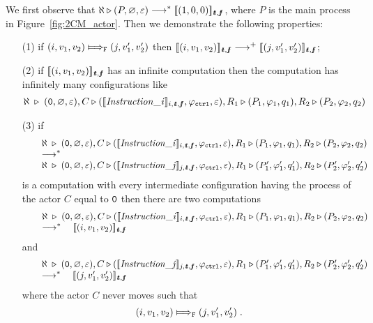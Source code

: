 \documentclass{LMCS}
\theoremstyle{plain}\newtheorem{proposition}[thm]{Proposition}
\theoremstyle{plain}\newtheorem{lemma}[thm]{Lemma}
\theoremstyle{plain}\newtheorem{theorem}[thm]{Theorem}
\theoremstyle{plain}\newtheorem{corollary}[thm]{Corollary}
\newcommand{\pinull}{{\tt 0}}
\newcommand{\lred}[1]{\stackrel{#1}{\longrightarrow}}
\newcommand{\false}{{\it f\hspace{-3pt}f}}
\newcommand{\true}{{\it t\hspace{-2.3pt}t}}
\newcommand{\semantics}[1]{[\![ #1 ]\!]}
\begin{document}
We first observe that $\aleph \triangleright (P, \varnothing, \varepsilon) \lred{}^*
\semantics{(1,0,0)}_{\true,\false}$, where $P$ is the main process in 
Figure~\ref{fig:2CM_actor}.
Then we demonstrate the following properties:
\begin{enumerate}
\item[(1)]
if $(i,v_1,v_2) \Longmapsto_{\tt F} (j,v_1',v_2')$ then 
$\semantics{(i,v_1,v_2)}_{\true,\false} \lred{}^+ 
\semantics{(j,v_1',v_2')}_{\true,\false}$;

\item[(2)]
if $\semantics{(i,v_1,v_2)}_{\true,\false}$ has an infinite computation then 
the computation has infinitely many configurations like
\begin{eqnarray}
\label{eq.one}
\aleph \; \triangleright \; (\pinull, \varnothing, \varepsilon),   C \triangleright (\semantics{{\it Instruction\_i}}_{i,\true,\false}, \varphi_{{\tt ctrl}}, \varepsilon), 
R_1 \triangleright (P_1, \varphi_1, q_1),
R_2 \triangleright (P_2, \varphi_2, q_2)
\end{eqnarray}

\item[(3)]
if
\[
\begin{array}{@{\qquad}l}
\aleph \; \triangleright \; (\pinull, \varnothing, \varepsilon),   C \triangleright (\semantics{{\it Instruction\_i}}_{i,\true,\false}, \varphi_{{\tt ctrl}}, \varepsilon), 
R_1 \triangleright (P_1, \varphi_1, q_1),
R_2 \triangleright (P_2, \varphi_2, q_2)
\\
\lred{}^*
\\
\aleph \; \triangleright \; (\pinull, \varnothing, \varepsilon),   C \triangleright (\semantics{{\it Instruction\_j}}_{j,\true,\false}, \varphi_{{\tt ctrl}}, \varepsilon), 
R_1 \triangleright (P_1', \varphi_1', q_1'),
R_2 \triangleright (P_2', \varphi_2', q_2')
\end{array}
\]
is a computation with every intermediate configuration having the process of
the actor $C$ equal to $\pinull$ then there are two computations
\[
\begin{array}{@{\qquad}l}
\aleph \; \triangleright \; (\pinull, \varnothing, \varepsilon),   C \triangleright (\semantics{{\it Instruction\_i}}_{i,\true,\false}, \varphi_{{\tt ctrl}}, \varepsilon), 
R_1 \triangleright (P_1, \varphi_1, q_1),
R_2 \triangleright (P_2, \varphi_2, q_2)
\\
\lred{}^* \quad \semantics{(i,v_1,v_2)}_{\true,\false}
\end{array}
\]
and
\[
\begin{array}{@{\qquad}l}
\aleph \; \triangleright \; (\pinull, \varnothing, \varepsilon),   C \triangleright (\semantics{{\it Instruction\_j}}_{j,\true,\false}, \varphi_{{\tt ctrl}}, \varepsilon), 
R_1 \triangleright (P_1', \varphi_1', q_1'),
R_2 \triangleright (P_2', \varphi_2', q_2')
\\
\lred{}^* \quad \semantics{(j,v_1',v_2')}_{\true,\false}
\end{array}
\]
where the actor $C$ never moves such that
\[
(i,v_1,v_2) \Longmapsto_{\tt F} (j,v_1',v_2') \;.
\]
\end{enumerate}
\end{document}
